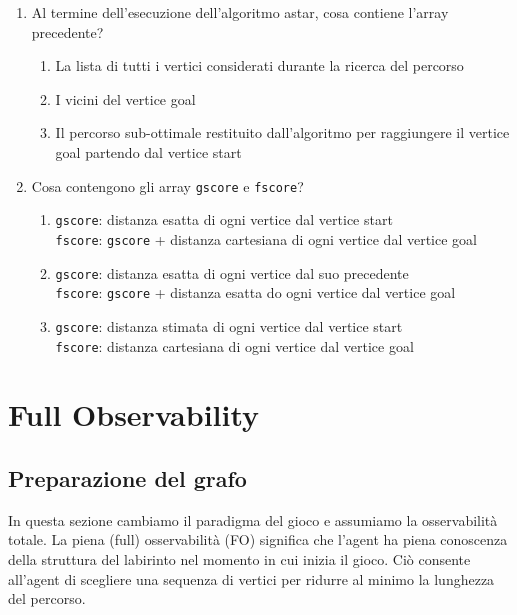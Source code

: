 \documentclass[8pt]{book}
\begin{document}
\begin{enumerate}
\item Al termine dell'esecuzione dell'algoritmo astar, cosa contiene l'array precedente?

\begin{enumerate}
\def\labelenumi{\alph{enumi}.}
\item
  La lista di tutti i vertici considerati durante la ricerca del percorso
\item
  I vicini del vertice goal
\item
  Il percorso sub-ottimale restituito dall'algoritmo per raggiungere il vertice goal partendo dal vertice start
\end{enumerate}

\item Cosa contengono gli array \texttt{gscore} e \texttt{fscore}?

\begin{enumerate}
\def\labelenumi{\alph{enumi}.}
\item
  \texttt{gscore}: distanza esatta di ogni vertice dal vertice start\\
  \texttt{fscore}: \texttt{gscore} + distanza cartesiana di ogni vertice dal vertice goal
\item
  \texttt{gscore}: distanza esatta di ogni vertice dal suo precedente\\
  \texttt{fscore}: \texttt{gscore} + distanza esatta do ogni vertice dal vertice goal
\item
  \texttt{gscore}: distanza stimata di ogni vertice dal vertice start\\
  \texttt{fscore}: distanza cartesiana di ogni vertice dal vertice goal
\end{enumerate}

\end{enumerate}

\part{Full Observability}

\chapter{Preparazione del grafo}

In questa sezione cambiamo il paradigma del gioco e assumiamo la osservabilità totale. La piena (full) osservabilità (FO) significa che l'agent ha piena conoscenza della struttura del labirinto nel momento in cui inizia il gioco. Ciò consente all'agent di scegliere una sequenza di vertici per ridurre al minimo la lunghezza del percorso.
\end{document}
